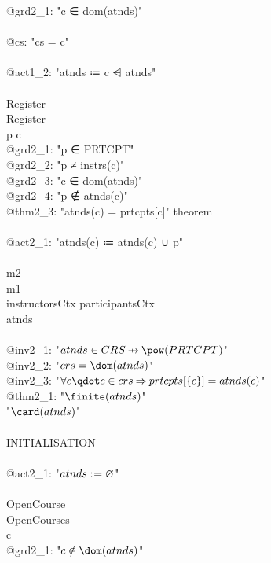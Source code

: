 \begin{description}
\begin{center}
\begin{Bcode}
      @grd2_1: "c ∈ dom(atnds)"\\
      \Bwith\\
      @cs: "cs = {c}"\\
      \Bthen\\
      @act1_2: "atnds ≔ {c} ⩤ atnds"\\
      \Bend\\
      Register \Bconvergent\\
      \Brefines Register\\
      \Bany{} p c \Bwhere\\
      @grd2_1: "p ∈ PRTCPT"\\
      @grd2_2: "p ≠ instrs(c)"\\
      @grd2_3: "c ∈ dom(atnds)"\\
      @grd2_4: "p ∉ atnds(c)"\\
      @thm2_3: "atnds(c) = prtcpts[{c}]" theorem\\
      \Bthen\\
      @act2_1: "atnds(c) ≔ atnds(c) ∪ {p}"\\
      \Bend\\
      \Bend
      \else
      \Bmachine{} m2\\
      \Brefines{} m1\\
      \Bsees{} instructorsCtx participantsCtx\\
      \Bvariables{} atnds\\
      \Binvariants\\
      \Btab @inv2_1: "\(atnds \in CRS \pfun \pow(PRTCPT)\)"\\
      \Btab @inv2_2: "\(crs = \dom(atnds)\)"\\
      \Btab @inv2_3: "\(\forall c \qdot c \in crs \limp prtcpts[\{c\}] = atnds(c)\)"\\
      \Btab @thm2_1: "\(\finite(atnds)\)" \Btheorem\\
      \Bvariant{} "\(\card(atnds)\)"\\
      \Bevents\\
      \Btab INITIALISATION\\
      \Btab \Bbegin\\
      \Btab \Btab @act2_1: "\(atnds \mathrel{:\mkern1mu=} \mathord\varnothing\)"\\
      \Btab \Bend\\
      \Btab OpenCourse\\
      \Btab \Brefines{} OpenCourses\\
      \Btab \Bany{} c \Bwhere\\
      \Btab \Btab @grd2_1: "\(c \notin \dom(atnds)\)"\\

\end{Bcode}
\end{center}
\end{description}
